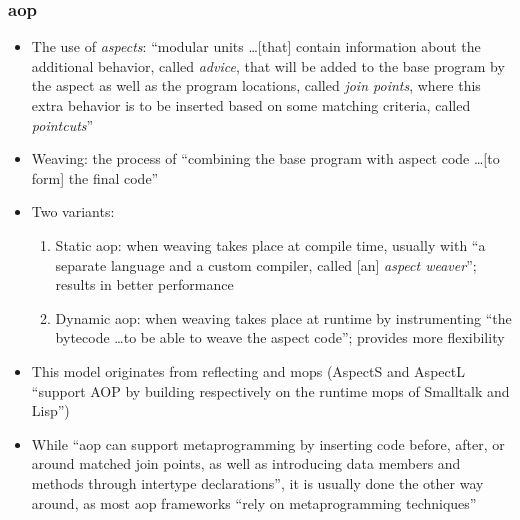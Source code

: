 \subsubsection{\acf{aop} \citep[p.~113:11-13]{lilis_survey_2019}}
\begin{itemize}
      \item The use of \emph{aspects}: ``modular units \dots [that] contain
            information about the additional behavior, called \emph{advice},
            that will be added to the base program by the aspect as well as
            the program locations, called \emph{join points}, where this extra
            behavior is to be inserted based on some matching criteria, called
            \emph{pointcuts}'' \citep[p.~113:12]{lilis_survey_2019}
      \item Weaving: the process of ``combining the base program with aspect
            code \dots [to form] the final code'' \citep[p.~113:12]{lilis_survey_2019}
      \item Two variants:
            \begin{enumerate}
                  \item Static \acs{aop}: when weaving takes place at compile
                        time, usually with ``a separate language and a custom
                        compiler, called [an] \emph{aspect weaver}''; results in
                        better performance \citep[p.~113:12]{lilis_survey_2019}
                  \item Dynamic \acs{aop}: when weaving takes place at runtime
                        by instrumenting ``the bytecode \dots to be able to
                        weave the aspect code''; provides more flexibility
                        \citep[p.~113:12]{lilis_survey_2019}
            \end{enumerate}
      \item This model originates from reflecting and \acsp{mop} (AspectS and
            AspectL ``support AOP by building respectively on the runtime
            \acsp{mop} of Smalltalk and Lisp'') \citep[p.~113:12]{lilis_survey_2019}
      \item While ``\acs{aop} can support metaprogramming by inserting code
            before, after, or around matched join points, as well as introducing
            data members and methods through intertype declarations'', it is
            usually done the other way around, as most \acs{aop} frameworks
            ``rely on metaprogramming techniques'' \citep[p.~113:12]{lilis_survey_2019}
\end{itemize}

